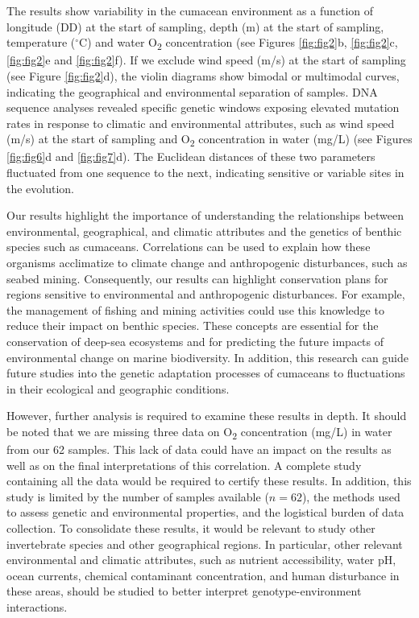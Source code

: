 The results show variability in the cumacean environment as a function of longitude (DD) at the start of sampling, depth (m) at the start of sampling, temperature ($^\circ$C) and water O\textsubscript{2} concentration (see Figures \ref{fig:fig2}b, \ref{fig:fig2}c, \ref{fig:fig2}e and \ref{fig:fig2}f). If we exclude wind speed (m/s) at the start of sampling (see Figure \ref{fig:fig2}d), the violin diagrams show bimodal or multimodal curves, indicating the geographical and environmental separation of samples. DNA sequence analyses revealed specific genetic windows exposing elevated mutation rates in response to climatic and environmental attributes, such as wind speed (m/s) at the start of sampling and O\textsubscript{2} concentration in water (mg/L) (see Figures \ref{fig:fig6}d and \ref{fig:fig7}d). The Euclidean distances of these two parameters fluctuated from one sequence to the next, indicating sensitive or variable sites in the evolution.

Our results highlight the importance of understanding the relationships between environmental, geographical, and climatic attributes and the genetics of benthic species such as cumaceans. Correlations can be used to explain how these organisms acclimatize to climate change and anthropogenic disturbances, such as seabed mining. Consequently, our results can highlight conservation plans for regions sensitive to environmental and anthropogenic disturbances. For example, the management of fishing and mining activities could use this knowledge to reduce their impact on benthic species. These concepts are essential for the conservation of deep-sea ecosystems and for predicting the future impacts of environmental change on marine biodiversity. In addition, this research can guide future studies into the genetic adaptation processes of cumaceans to fluctuations in their ecological and geographic conditions.

However, further analysis is required to examine these results in depth. It should be noted that we are missing three data on O\textsubscript{2} concentration (mg/L) in water from our 62 samples. This lack of data could have an impact on the results as well as on the final interpretations of this correlation. A complete study containing all the data would be required to certify these results. In addition, this study is limited by the number of samples available ($n=62$), the methods used to assess genetic and environmental properties, and the logistical burden of data collection. To consolidate these results, it would be relevant to study other invertebrate species and other geographical regions. In particular, other relevant environmental and climatic attributes, such as nutrient accessibility, water pH, ocean currents, chemical contaminant concentration, and human disturbance in these areas, should be studied to better interpret genotype-environment interactions.

